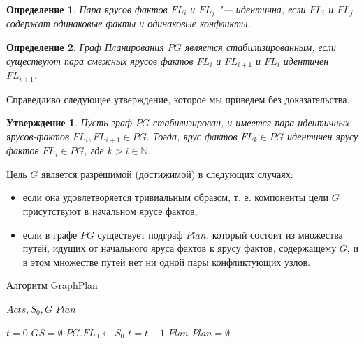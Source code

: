 \documentclass[b5paper,11pt]{book}
\newtheorem{Def}{Определение}
\newtheorem{St}{Утверждение}
\numberwithin{Def}{section}
\numberwithin{Th}{chapter}
\numberwithin{St}{chapter}
\begin{document}
	\begin{Def}
		Пара ярусов фактов $FL_i$ и $FL_j$ "--- идентична, если $FL_i$ и $FL_j$ содержат одинаковые факты и одинаковые конфликты.
	\end{Def}
		
	\begin{Def}
		Граф Планирования $PG$ является стабилизированным, если существуют пара смежных ярусов фактов $FL_i$ и $FL_{i + 1}$ и $FL_i$ идентичен $FL_{i + 1}$.
	\end{Def}
	
	Справедливо следующее утверждение, которое мы приведем без доказательства.
	
	\begin{St}
		Пусть граф $PG$ стабилизирован, и имеется пара идентичных ярусов-фактов $FL_i, FL_{i + 1} \in PG$. Тогда, ярус фактов $FL_k\in PG$ идентичен ярусу фактов $FL_i\in PG$, где $k > i \in \mathbb{N}$.
	\end{St}
	
	Цель $G$ является разрешимой (достижимой) в следующих случаях: 
	\begin{itemize}
		\item если она удовлетворяется тривиальным образом, т. е. компоненты цели $G$ присутствуют в начальном ярусе фактов, 
		\item если в графе $PG$ существует подграф $Plan$, который состоит из множества путей, идущих от начального яруса
		фактов к ярусу фактов, содержащему $G$, и в этом множестве путей нет ни одной пары конфликтующих узлов.
	\end{itemize}
		
	\begin{algorithm}[h]
		\caption{Алгоритм GraphPlan}\label{alg:graphplan}
		\begin{algorithmic}[1]
			\Require $Acts, S_0, G$
			\Ensure $Plan$
			
			\State $t = 0$ 
			\State $GS = \emptyset$ 
			\State $PG.FL_0 \leftarrow S_0$
				\State {}
				\State {}
				\State $t = t + 1$ 
			\EndWhile
				\State \Return $Plan$
			\Else
				\State \Return $Plan = \emptyset$
			\EndIf
		\end{algorithmic}
	\end{algorithm}
\end{document}
